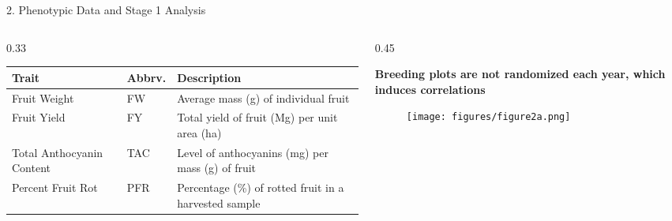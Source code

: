 \documentclass[final]{beamer}
\newlength{\twocolwid}
\begin{document}
\begin{frame}[t]
\begin{columns}[t]
\begin{column}{\twocolwid}
\begin{block}{2. Phenotypic Data and Stage 1 Analysis}
\begin{columns}[t,totalwidth=\twocolwid]
\begin{column}{0.33\twocolwid}
\begin{scriptsize}
\end{scriptsize}





\begin{scriptsize}

\begin{table}
\centering
\begin{tabular}{>{\raggedright\arraybackslash}p{2in}>{\centering\arraybackslash}p{1in}>{\centering\arraybackslash}p{5.5in}}
\toprule
\textbf{Trait} & \textbf{Abbrv.} & \textbf{Description}\\
\midrule
Fruit Weight & FW & Average mass (g) of individual fruit \\
Fruit Yield & FY & Total yield of fruit (Mg) per unit area (ha) \\
Total Anthocyanin Content & TAC & Level of anthocyanins (mg) per mass (g) of fruit \\
Percent Fruit Rot & PFR & Percentage (\%) of rotted fruit in a harvested sample \\
\bottomrule
\end{tabular}
\end{table}

\end{scriptsize}


\end{column}



\begin{column}{0.45\twocolwid}
\vspace{-2cm}

\begin{footnotesize}

\textbf{Breeding plots are not randomized each year, which induces correlations}

\end{footnotesize}


\begin{center}
  \begin{figure}
    \texttt{[image: figures/figure2a.png]}
  \end{figure}
\end{center}

\end{column}










\end{columns}
\end{block}
\end{column}
\end{columns}
\end{frame}
\end{document}

